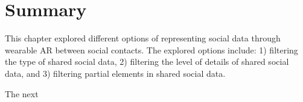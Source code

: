 \section{Summary}

This chapter explored different options of representing social data through wearable AR between social contacts. The explored options include: 1) filtering the type of shared social data, 2) filtering the level of details of shared social data, and 3) filtering partial elements in shared social data. 

The next